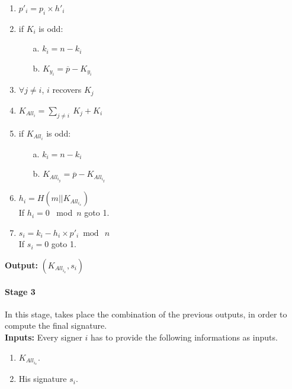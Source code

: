 \hspace{1.2cm}
\begin{minipage}[l]{2\linewidth}
	\begin{enumerate}
		\item $p'_{i}= p_{i}\times h'_{i}$
		\item if $K_{i}$ is odd:
		\begin{itemize}
			\item[a.] $k_{i}=n-k_{i}$
			\item[b.] $K_{y_{i}}=\overline{p}-K_{y_{i}}$
		\end{itemize}
		\item $\forall j\neq i$, $i$ recovers $K_{j}$
		\item $K_{All_{i}}=\sum_{j\neq i}\ {K_{j}}+K_{i}$
		\item if $K_{All_{i}}$ is odd:
		\begin{itemize}
			\item[a.] $k_{i}=n-k_{i}$
			\item[b.] $K_{All_{i_{y}}}=\overline{p}-K_{All_{i_{y}}}$
		\end{itemize}
		\item $h_{i}=H(m||K_{All_{i_{x}}})$\\
		If $h_{i}=0$ \ mod\ $n$ goto 1.
		\item $s_{i}=k_{i} - h_{i} \times p'_{i} \bmod\ n$ \\
		If $s_{i}=0$ goto 1.
	\end{enumerate}
\end{minipage}

\textbf{Output:} $(K_{All_{i_{x}}}, s_{i})$
\paragraph{Stage 3}
In this stage, takes place the combination of the previous outputs, in order to compute the final signature.\\
\textbf{Inputs:} Every signer $i$ has to provide the following informations as inputs.

\hspace{1.1cm}
\begin{minipage}[l]{2\linewidth}
	\begin{enumerate}
		\item $K_{All_{i_{x}}}$.
		\item His signature $s_{i}$.\\
	\end{enumerate}
\end{minipage}



